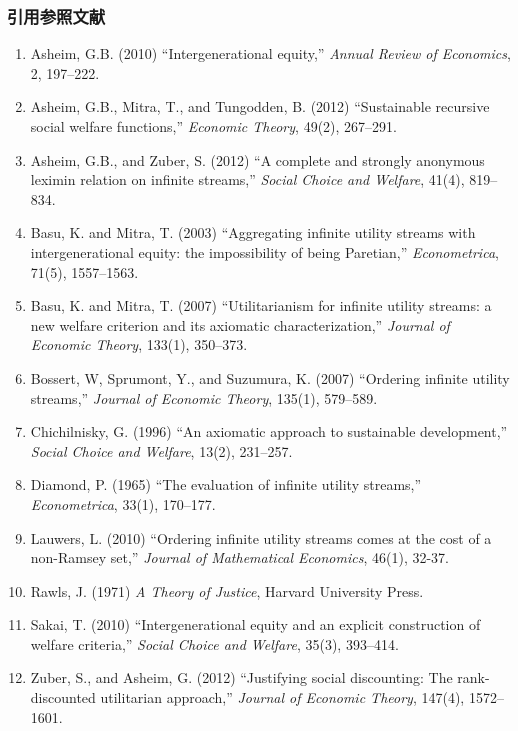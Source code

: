 \documentclass[11pt,a4paper]{article}
\begin{document}
\clearpage

\subsubsection*{引用参照文献}

\begin{enumerate}
  \item Asheim, G.B. (2010) ``Intergenerational equity,''
    \textit{Annual Review of Economics}, 2, 197--222.
  \item Asheim, G.B., Mitra, T., and Tungodden, B. (2012) ``Sustainable recursive social welfare functions,''
    \textit{Economic Theory}, 49(2), 267--291.
  \item Asheim, G.B., and Zuber, S. (2012) ``A complete and strongly anonymous leximin relation on infinite streams,''
    \textit{Social Choice and Welfare}, 41(4), 819--834.
  \item Basu, K. and Mitra, T. (2003) ``Aggregating infinite utility streams with intergenerational equity: the impossibility of being Paretian,''
    \textit{Econometrica}, 71(5), 1557--1563.
  \item Basu, K. and Mitra, T. (2007) ``Utilitarianism for infinite utility streams: a new welfare criterion and its axiomatic characterization,''
    \textit{Journal of Economic Theory}, 133(1), 350--373.
  \item Bossert, W, Sprumont, Y., and Suzumura, K. (2007) ``Ordering infinite utility streams,''
    \textit{Journal of Economic Theory}, 135(1), 579--589.
  \item Chichilnisky, G. (1996) ``An axiomatic approach to sustainable development,''
    \textit{Social Choice and Welfare}, 13(2), 231--257.
  \item Diamond, P. (1965) ``The evaluation of infinite utility streams,''
    \textit{Econometrica}, 33(1), 170--177.
  \item Lauwers, L. (2010) ``Ordering infinite utility streams comes at the cost of a non-Ramsey set,''
    \textit{Journal of Mathematical Economics}, 46(1), 32-37.
  \item Rawls, J. (1971) \textit{A Theory of Justice}, Harvard University Press.
  \item Sakai, T. (2010) ``Intergenerational equity and an explicit construction of welfare criteria,''
    \textit{Social Choice and Welfare}, 35(3), 393--414.
  \item Zuber, S., and Asheim, G. (2012) ``Justifying social discounting: The rank-discounted utilitarian approach,''
    \textit{Journal of Economic Theory}, 147(4), 1572--1601.
\end{enumerate}
\end{document}
